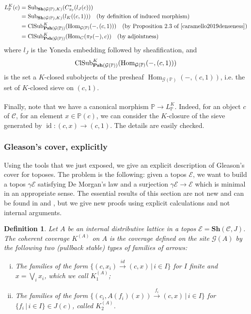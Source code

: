\documentclass{article}
\newtheorem{definition}[theorem]{Definition}
\newcommand{\Hom}{\operatorname{Hom}}
\newcommand{\id}{\operatorname{id}}
\newcommand{\pcat}{\mathbb{P}}
\begin{document}
\begin{align*}
    L_\pcat^K(c) & =\textup{Sub}_{\mathbf{Sh}(\mathcal{G}(\pcat),K)}(C_{\pi_\pcat}^*(l_J(c)))\\
    & =\textup{Sub}_{\mathbf{Sh}(\mathcal{G}(\pcat),K)}(l_K((c,1)))\quad \text{(by definition of induced morphism)}\\
    & =\textup{ClSub}^K_{\mathbf{Psh}(\mathcal{G}(\pcat))}(\Hom_{\mathcal{G}(\pcat)}(-,(c,1)))\quad\text{(by Proposition~2.3 of \cite{caramello2019denseness})}\\
    & =\textup{ClSub}^K_{\mathbf{Psh}(\mathcal{G}(\pcat))}(\Hom_C(\pi_\pcat(-),c)) \quad\text{(by adjointness)}
\end{align*}
where $l_J$ is the Yoneda embedding followed by sheafification, and $$\textup{ClSub}^K_{\mathbf{Psh}(\mathcal{G}(\pcat))}(\Hom_{\mathcal{G}(\pcat)}(-,(c,1)))$$ is the set a $K$-closed subobjects of the presheaf $\Hom_{\mathcal{G}(\pcat)}(-,(c,1))$, i.e. the set of $K$-closed sieve on $(c,1)$.\\
\\
Finally, note that we have a canonical morphism $\pcat\xrightarrow{}L_\pcat^K$. Indeed, for an object $c$ of $\mathcal{C}$, for an element $x\in\pcat(c)$, we can consider the $K$-closure of the sieve generated by $\id:(c,x)\xrightarrow{}(c,1)$. The details are easily checked.

\subsubsection{Gleason's cover, explicitly}
Using the tools that we just exposed, we give an explicit description of Gleason's cover for toposes. The problem is the following: given a topos $\mathcal{E}$, we want to build a topos $\gamma\mathcal{E}$ satisfying De Morgan's law and a surjection $\gamma\mathcal{E}\xrightarrow{}\mathcal{E}$ which is minimal in an appropriate sense. The essential results of this section are not new and can be found in \cite{johnstone1980gleason} and \cite{harun1996applications}, but we give new proofs using explicit calculations and not internal arguments.

\begin{definition}
    Let $A$ be an internal distributive lattice in a topos $\mathcal{E}=\mathbf{Sh}(\mathcal{C},J)$. The coherent coverage $K^{(A)}$ on $A$ is the coverage defined on the site $\mathcal{G}(A)$ by the following two (pullback stable) types of families of arrows:
    \begin{enumerate}[(i)]
        \item The families of the form $\{(c,x_i)\xrightarrow{id}(c,x)\,|\,i\in I\}$ for $I$ finite and $x=\bigvee_i x_i$, which we call $K_1^{(A)}$;
    \item The families of the form $\{(c_i,A(f_i)(x))\xrightarrow{f_i}(c,x)\,|\,i\in I\}$ for $\{f_i\,|\,i\in I\}\in J(c)$, called $K_2^{(A)}$.
    \end{enumerate}
\end{definition}
\end{document}
